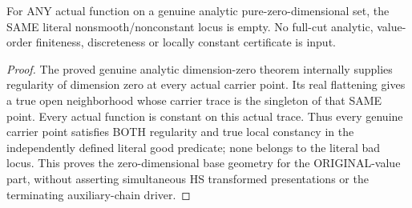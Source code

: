 \begin{lemma}
\label{hir:actual-full-value-zero-dimensional-variation-empty}
\leanok
For ANY actual function on a genuine analytic pure-zero-dimensional set,
the SAME literal nonsmooth/nonconstant locus is empty. No full-cut analytic,
value-order finiteness, discreteness or locally constant certificate is input.
\end{lemma}
\begin{proof}
The proved genuine analytic dimension-zero theorem internally supplies
regularity of dimension zero at every actual carrier point. Its real
flattening gives a true open neighborhood whose carrier trace is the
singleton of that SAME point. Every actual function is constant on this
actual trace. Thus every genuine carrier point satisfies BOTH regularity
and true local constancy in the independently defined literal good predicate;
none belongs to the literal bad locus. This proves the zero-dimensional
base geometry for the ORIGINAL-value part, without asserting simultaneous
HS transformed presentations or the terminating auxiliary-chain driver.
\end{proof}
